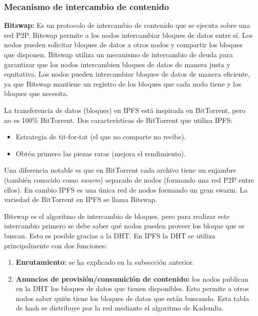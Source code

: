 \subsubsection{Mecanismo de intercambio de contenido}

\textbf{Bitswap:} Es un protocolo de intercambio de contenido que se ejecuta sobre una red P2P. Bitswap permite a los nodos intercambiar bloques de datos entre
sí. Los nodos pueden solicitar bloques de datos a otros nodos y compartir los bloques que disponen. Bitswap utiliza un mecanismo de intercambio de deuda para
garantizar que los nodos intercambien bloques de datos de manera justa y equitativa. Los nodos pueden intercambiar bloques de datos de manera eficiente, ya que
Bitswap mantiene un registro de los bloques que cada nodo tiene y los bloques que necesita.

La transferencia de datos (bloques) en IPFS está inspirada en BitTorrent, pero no es 100\% BitTorrent. Dos características de BitTorrent que utiliza IPFS:
\begin{itemize}[itemsep=1pt,nolistsep]
      \item Estrategia de tit-for-tat (el que no comparte no recibe).
      \item Obtén primero las piezas raras (mejora el rendimiento).
\end{itemize}
Una diferencia notable es que en BitTorrent cada archivo tiene un enjambre (también conocido como \textit{swarm}) separado de nodos (formando una red P2P entre ellos). En cambio IPFS es una única red de nodos formando un gran swarm. La variedad de BitTorrent en IPFS se llama Bitswap.

Bitswap es el algoritmo de intercambio de bloques, pero para realizar este intercambio primero se debe saber qué nodos pueden proveer los bloque que se buscan.
Esto es posible gracias a la DHT. En IPFS la DHT se utiliza principalmente con dos funciones:
\begin{enumerate}
      \item \textbf{Enrutamiento:} se ha explicado en la subsección anterior.
      \item \textbf{Anuncios de provisión/consumición de contenido:} los nodos publican en la DHT los bloques de datos que tienen disponibles. Esto permite a otros nodos saber quién tiene los bloques de datos que están buscando. Esta tabla de hash se distribuye por la red mediante el algoritmo de Kademlia.
\end{enumerate}

